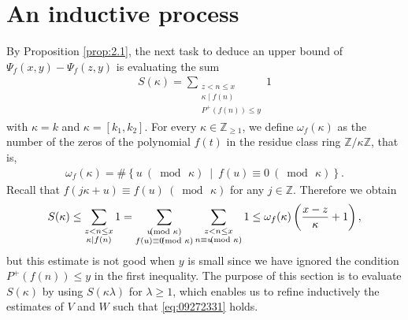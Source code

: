 \documentclass[a4paper,11pt]{amsart}
\theoremstyle{definition}
\numberwithin{equation}{section}
\begin{document}
\section{An inductive process}\label{sec:3}
By Proposition \ref{prop:2.1}, the next task to deduce an upper bound of $\Psi_f(x,y)-\Psi_f(z,y)$ is evaluating the sum
\begin{align*}
S(\kappa)
= \sum_{\substack{z<n \leq x \\ \kappa \mid f(n) \\ P^+(f(n)) \leq y}} 1
\end{align*}
with $\kappa=k$ and $\kappa=[k_1,k_2]$. 
For every $\kappa \in \mathbb{Z}_{\geq1}$, we define $\omega_f(\kappa)$ as the number of the zeros of the polynomial $f(t)$ in the residue class ring $\mathbb{Z}/\kappa \mathbb{Z}$, that is, 
\begin{align}\label{eq:10101628}
\omega_f(\kappa)
= \# \left\{ u ~(\bmod\,{\kappa}) ~\middle|~ f(u) \equiv 0 ~(\bmod\,{\kappa}) \right\}. 
\end{align}
Recall that $f(j \kappa+u) \equiv f(u) ~(\bmod\,{\kappa})$ for any $j \in \mathbb{Z}$. 
Therefore we obtain 
\begin{align}\label{eq:09300001}
S(\kappa)
\leq \sum_{\substack{z<n \leq x \\ \kappa \mid f(n)}} 1
= \sum_{\substack{u \hspace{-2mm} \pmod{\kappa} \\ f(u) \equiv 0 \hspace{-2mm} \pmod{\kappa}}} 
\sum_{\substack{z<n \leq x \\ n \equiv u \hspace{-2mm} \pmod{\kappa}}} 1 
\leq \omega_f(\kappa) \left(\frac{x-z}{\kappa}+1\right),
\end{align}
but this estimate is not good when $y$ is small since we have ignored the condition $P^+(f(n)) \leq y$ in the first inequality. 
The purpose of this section is to evaluate $S(\kappa)$ by using $S(\kappa \lambda)$ for $\lambda \geq1$, which enables us to refine inductively the estimates of $V$ and $W$ such that \eqref{eq:09272331} holds. 
\end{document}
